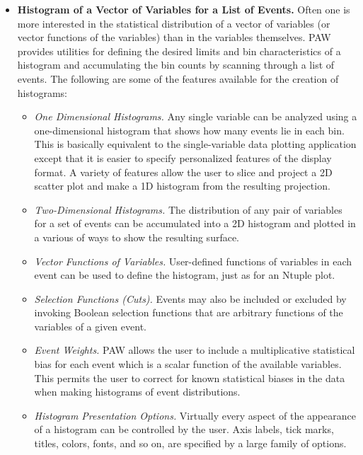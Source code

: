 \begin{itemize}
\item {\bf Histogram of a Vector of Variables for a List of Events.}
      Often one is more interested in the statistical distribution of a vector 
      of variables (or vector functions of the variables) than in the variables
      themselves.  PAW provides utilities for defining the desired limits and 
      bin characteristics of a histogram and accumulating the bin counts by 
      scanning through a list of events. The following are some of the features
      available for the creation of histograms:
 
\begin{itemize}
\item {\it One Dimensional Histograms.\/} Any single variable can be analyzed 
      using a one-dimensional histogram that shows how many events lie in each 
      bin. This is basically equivalent to the single-variable data plotting 
      application except that it is easier to specify personalized features of 
      the display format. A variety of features allow the user to slice and 
      project a 2D scatter plot and make a 1D histogram from the resulting 
      projection.
\item {\it  Two-Dimensional Histograms.\/} The distribution of any pair of 
      variables for a set of events can be accumulated into a 2D histogram and 
      plotted in a various of ways to show the resulting surface.
\item {\it Vector Functions of Variables.\/} User-defined functions of variables      in each event can be used to define the histogram, just as for an Ntuple 
      plot.
\item {\it Selection Functions (Cuts).\/} Events may also be included or 
      excluded by invoking Boolean selection functions that are arbitrary 
      functions of the variables of a given event.
\item {\it Event Weights.\/} PAW allows the user to include a multiplicative 
      statistical bias for each event which is a scalar function of the 
      available variables. This permits the user to correct for known 
      statistical biases in the data when making histograms of event 
      distributions.
\item {\it Histogram Presentation Options.\/} Virtually every aspect of the 
      appearance of a histogram can be controlled by the user.  Axis labels, 
      tick marks, titles, colors, fonts, and so on, are specified by a large 
      family of options.
\end{itemize}
 

\end{itemize}
